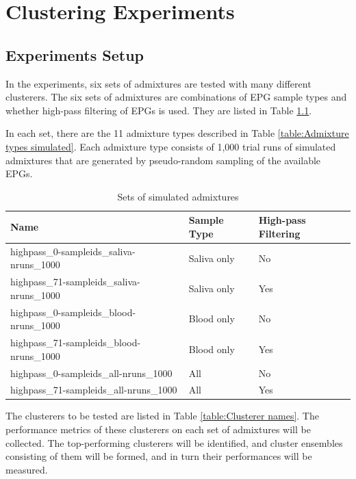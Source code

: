 
\chapter{Clustering Experiments}
\label{ch:Clustering Experiments}
\thispagestyle{myheadings}

\section{Experiments Setup}

In the experiments, six sets of admixtures are tested with many different clusterers. The six sets of admixtures are combinations of EPG sample types and whether high-pass filtering of EPGs is used. They are listed in Table \ref{table:Sets of simulated admixtures}.

In each set, there are the 11 admixture types described in Table \ref{table:Admixture types simulated}. Each admixture type consists of 1,000 trial runs of simulated admixtures that are generated by pseudo-random sampling of the available EPGs.

\begin{table}[htbp]
\centering
\begin{tabular}{lll}
\toprule
                                   Name & Sample Type & High-pass Filtering \\
\midrule
 highpass\_0-sampleids\_saliva-nruns\_1000 & Saliva only &                  No \\
highpass\_71-sampleids\_saliva-nruns\_1000 & Saliva only &                 Yes \\
  highpass\_0-sampleids\_blood-nruns\_1000 &  Blood only &                  No \\
 highpass\_71-sampleids\_blood-nruns\_1000 &  Blood only &                 Yes \\
    highpass\_0-sampleids\_all-nruns\_1000 &         All &                  No \\
   highpass\_71-sampleids\_all-nruns\_1000 &         All &                 Yes \\
\bottomrule
\end{tabular}
\caption{Sets of simulated admixtures}
\label{table:Sets of simulated admixtures}
\end{table}

The clusterers to be tested are listed in Table \ref{table:Clusterer names}. The performance metrics of these clusterers on each set of admixtures will be collected. The top-performing clusterers will be identified, and cluster ensembles consisting of them will be formed, and in turn their performances will be measured.

